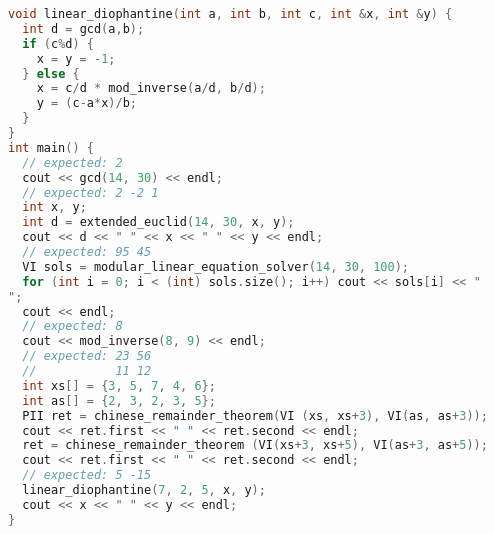 \begin{lstlisting}[language=C++]
void linear_diophantine(int a, int b, int c, int &x, int &y) {
  int d = gcd(a,b);
  if (c%d) {
    x = y = -1;
  } else {
    x = c/d * mod_inverse(a/d, b/d);
    y = (c-a*x)/b;
  }
}
int main() {
  // expected: 2
  cout << gcd(14, 30) << endl;
  // expected: 2 -2 1
  int x, y;
  int d = extended_euclid(14, 30, x, y);
  cout << d << " " << x << " " << y << endl;
  // expected: 95 45
  VI sols = modular_linear_equation_solver(14, 30, 100);
  for (int i = 0; i < (int) sols.size(); i++) cout << sols[i] << " 
"; 
  cout << endl;
  // expected: 8
  cout << mod_inverse(8, 9) << endl;
  // expected: 23 56
  //           11 12
  int xs[] = {3, 5, 7, 4, 6};
  int as[] = {2, 3, 2, 3, 5};
  PII ret = chinese_remainder_theorem(VI (xs, xs+3), VI(as, as+3));
  cout << ret.first << " " << ret.second << endl;
  ret = chinese_remainder_theorem (VI(xs+3, xs+5), VI(as+3, as+5));
  cout << ret.first << " " << ret.second << endl;
  // expected: 5 -15
  linear_diophantine(7, 2, 5, x, y);
  cout << x << " " << y << endl;
}
\end{lstlisting}
